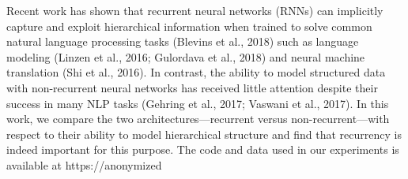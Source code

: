 Recent work has shown that recurrent neural networks (RNNs) can implicitly capture and exploit hierarchical information when trained to solve common natural language processing tasks (Blevins et al., 2018) such as language modeling (Linzen et al., 2016; Gulordava et al., 2018) and neural machine translation (Shi et al., 2016). In contrast, the ability to model structured data with non-recurrent neural networks has received little attention despite their success in many NLP tasks (Gehring et al., 2017; Vaswani et al., 2017). In this work, we compare the two architectures—recurrent versus non-recurrent—with respect to their ability to model hierarchical structure and find that recurrency is indeed important for this purpose. The code and data used in our experiments is available at https://anonymized

